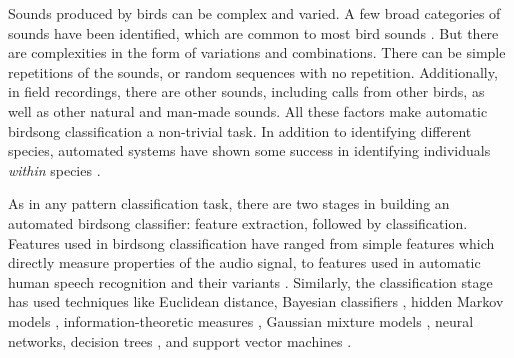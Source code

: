 \documentclass{article}
\begin{document}

Sounds produced by birds can be complex and varied. A few broad categories of
sounds have been identified, which are common to most bird sounds
\cite{brandes_automatedSoundRecording2008}. But there are complexities in the
form of variations and combinations. There can be simple repetitions of the
sounds, or random sequences with no repetition.  Additionally, in field
recordings, there are other sounds, including calls from other birds, as well as
other natural and man-made sounds. All these factors make automatic birdsong
classification a non-trivial task. In addition to identifying different species,
automated systems have shown some success in identifying individuals
\emph{within} species \cite{kirschel_territorial2011}.

As in any pattern classification task, there are two stages in building an
automated birdsong classifier: feature extraction, followed by classification.
Features used in birdsong classification have ranged from simple features which
directly measure properties of the audio signal, to features used in automatic
human speech recognition and their variants \cite{somervuo_parametric2006,
tyagi_spectralEnsemble2006, graciarena_acousticFrontEnd2010, tan_sparse2012}. 
Similarly, the classification stage has used
techniques like Euclidean distance, Bayesian classifiers
\cite{lopes_largeSpecies2011}, hidden Markov models
\cite{chu_hmmBird2011, graciarena_acousticSequence2011},
information-theoretic measures \cite{wang_entropyBird2013}, Gaussian mixture models
\cite{lee_gmmImageShape2013}, neural networks\cite{mporas_automatedAcoustic2012}, 
decision trees \cite{neal_timeFreq2011}, and support vector machines
\cite{tan_sparse2012}.


\end{document}
